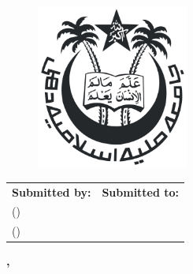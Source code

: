 \begin{titlepage}
    \begin{center}
        \begin{chaptersize}
            \projectTitle{}\\[\baselineskip]
        \end{chaptersize}

        \vspace{20mm}
        \begin{figure}[H]
            \centering
            \includegraphics[width=50mm]{img/jmi.png}
        \end{figure}
        \vspace{20mm}

        \begin{subsectionsize}
            \begin{center}
                \begin{tabularx}{\textwidth}{L R}
                    \textbf{Submitted by:}                  & \textbf{Submitted to:}\\
                    \authorAbhinav{} (\authorAbhinavRoll{}) & \reviewerName{} \\
                    \authorAshhar{} (\authorAshharRoll{})   & \\
                \end{tabularx}
            \end{center}

            \null\vfill

            \textbf{%
                \departmentName{}\linebreak
                \facultyName{}\linebreak
                \collegeName{}, \cityNamePin{}
            }
        \end{subsectionsize}
    \end{center}
\end{titlepage}
